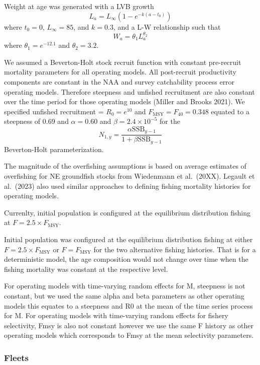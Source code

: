 \documentclass[
  12pt,
]{article}
\begin{document}
Weight at age was generated with a LVB growth \[
L_a = L_{\infty}\left(1 - e^{-k(a - t_0)}\right)
\] where \(t_0 = 0\), \(L_\infty = 85\), and \(k = 0.3\), and a L-W
relationship such that \[
W_a = \theta_1 L_a^{\theta_2}
\] where \(\theta_1 = e^{-12.1}\) and \(\theta_2 = 3.2\).

We assumed a Beverton-Holt stock recruit function with constant
pre-recruit mortality parameters for all operating models. All
post-recruit productivity components are constant in the NAA and survey
catchability process error operating models. Therefore steepness and
unfished recruitment are also constant over the time period for those
operating models (Miller and Brooks 2021). We specified unfished
recruitment = \(R_0 = e^{10}\) and \(F_{\text{MSY}} = F_{40} = 0.348\)
equated to a steepness of 0.69 and \(\alpha=0.60\) and
\(\beta = 2.4 \times 10^{-5}\) for the \[
N_{1,y} = \frac{\alpha \text{SSB}_{y-1}}{1 + \beta \text{SSB}_{y-1}} 
\] Beverton-Holt parameterization.

The magnitude of the overfishing assumptions is based on average
estimates of overfishing for NE groundfish stocks from Wiedenmann et
al.~(20XX). Legault et al.~(2023) also used similar approaches to
defining fishing mortality histories for operating models.

Currenlty, initial population is configured at the equilibrium
distribution fishing at \(F = 2.5\times F_{\text{MSY}}\).

Initial population was configured at the equilibrium distribution
fishing at either \(F = 2.5\times F_{\text{MSY}}\) or
\(F = F_{\text{MSY}}\) for the two alternative fishing histories. That
is for a deterministic model, the age composition would not change over
time when the fishing mortality was constant at the respective level.

For operating models with time-varying random effects for M, steepness
is not constant, but we used the same alpha and beta parameters as other
operating models this equates to a steepness and R0 at the mean of the
time series process for M. For operating models with time-varying random
effects for fishery selectivity, Fmsy is also not constant however we
use the same F history as other operating models which corresponds to
Fmsy at the mean selectivity parameters.

\hypertarget{fleets}{%
\subsubsection{Fleets}\label{fleets}}
\end{document}
